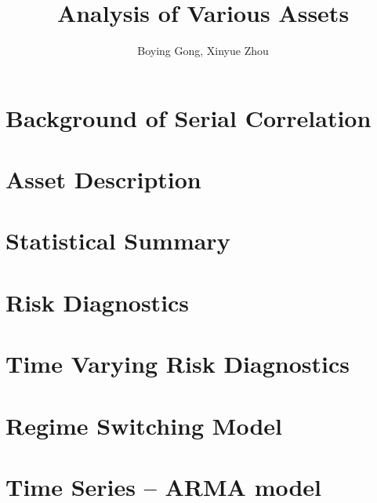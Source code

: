 \documentclass[12pt]{article}
\title{Analysis of Various Assets}
\author{Boying Gong, Xinyue Zhou}
\begin{document}
\maketitle

\tableofcontents

\clearpage

\section{Background of Serial Correlation}%



\section{Asset Description}%




\section{Statistical Summary}%




\section{Risk Diagnostics}%



\section{Time Varying Risk Diagnostics}%



\section{Regime Switching Model}%



\clearpage

\section{Time Series -- ARMA model}%
\end{document}
